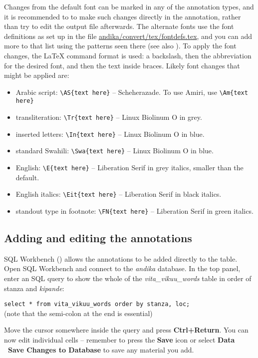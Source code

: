 Changes from the default font can be marked in any of the annotation types, and it is recommended to to make such changes directly in the annotation, rather than try to edit the output file afterwards.  The alternate fonts use the font definitions as set up in the file \url{andika/convert/tex/fontdefs.tex}, and you can add more to that list using the patterns seen there (see also ).  To apply the font changes, the LaTeX command format is used: a backslash, then the abbreviation for the desired font, and then the text inside braces.  Likely font changes that might be applied are:
\begin{itemize}
\item Arabic script: \verb|\AS{text here}| -- Scheherazade.  To use Amiri, use \verb|\Am{text here}|
\item transliteration: \verb|\Tr{text here}| -- Linux Biolinum O in grey.
\item inserted letters: \verb|\In{text here}| -- Linux Biolinum O in blue.
\item standard Swahili: \verb|\Swa{text here}| -- Linux Biolinum O in blue.
\item English: \verb|\E{text here}| -- Liberation Serif in grey italics, smaller than the default.
\item English italics: \verb|\Eit{text here}| -- Liberation Serif in black italics.	
\item standout type in footnote: \verb|\FN{text here}| -- Liberation Serif in green italics. 
\end{itemize}


\subsection{Adding and editing the annotations}

SQL Workbench () allows the annotations to be added directly to the table.  Open SQL Workbench and connect to the \textit{andika} database.  In the top panel, enter an SQL query to show the whole of the \textit{vita_vikuu_words} table in order of stanza and \textit{kipande}:

\verb|select * from vita_vikuu_words order by stanza, loc;|\\
(note that the semi-colon at the end is essential)

Move the cursor somewhere inside the query and press \textbf{Ctrl+Return}.  You can now edit individual cells -- remember to press the \textbf{Save} icon or select \textbf{Data \textrightarrow\ Save Changes to Database} to save any material you add.


